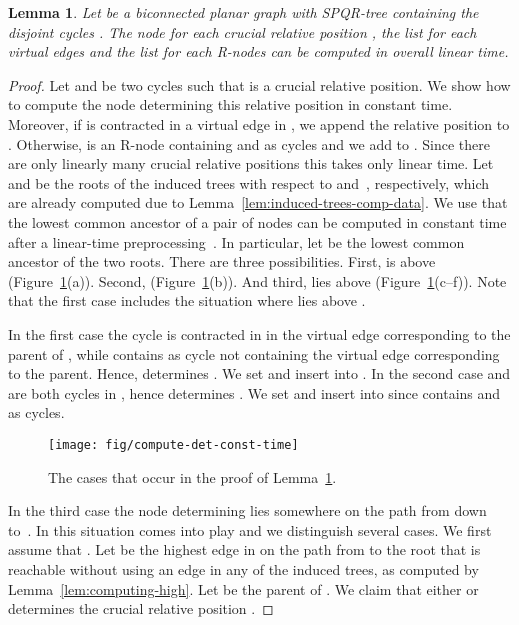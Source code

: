 \documentclass{scrartcl}
\newcommand{\1}[1]{{\normalfont \ensuremath{#1^{\tiny\circled{1}}}}} \newcommand{\2}[1]{{\normalfont \ensuremath{#1^{\tiny\circled{2}}}}} \renewcommand{\k}[1]{{\normalfont \ensuremath{#1^{\tiny\circled{k}}}}} \newcommand{\proj}[2]{\ensuremath{\left.#1\right|_{#2}}} \newcommand{\eps}{\varepsilon}
\theoremstyle{plain} \newtheorem{theorem}{Theorem} \newcounter{lemmacounter} \setcounter{lemmacounter}{0} \newtheorem{lemma}[lemmacounter]{Lemma} \newtheorem{fact}{Fact}  \newtheorem{corollary}{Corollary} \theoremstyle{definition} \newtheorem{definition}{Definition}
\begin{document}
\begin{lemma}
  \label{lem:compute-det-and-contr}
  Let  be a biconnected planar graph with SPQR-tree 
  containing the disjoint cycles .  The node
   for each crucial relative position ,
  the list  for each virtual edges  and the list
   for each R-nodes  can be computed in overall
  linear time.
\end{lemma}
\begin{proof}
  Let  and  be two cycles such that  is a crucial
  relative position.  We show how to compute the node
   determining this relative position in constant
  time.  Moreover, if  is contracted in a virtual edge  in
  , we append the relative position  to
  .  Otherwise,  is an R-node
  containing  and  as cycles and we add  to
  .  Since there are only linearly many
  crucial relative positions this takes only linear time.  Let  and 
  be the roots of the induced trees with respect to  and~,
  respectively, which are already computed due to
  Lemma~\ref{lem:induced-trees-comp-data}.  We use that the lowest
  common ancestor of a pair of nodes can be computed in constant time
  after a linear-time preprocessing~\cite{ht-fafnca-84, bf-lcapr-00}.
  In particular, let  be the lowest common ancestor
  of the two roots.  There are three possibilities.  First,  is above  (Figure~\ref{fig:compute-det-cases}(a)).
  Second, 
  (Figure~\ref{fig:compute-det-cases}(b)).  And third,  lies above 
  (Figure~\ref{fig:compute-det-cases}(c--f)).  Note that the first
  case includes the situation where  lies
  above .

  In the first case the cycle  is contracted in  in the
  virtual edge  corresponding to the parent of , while
   contains  as cycle  not containing the virtual edge
   corresponding to the parent.  Hence,  determines
  .  We set  and insert
   into .  In the second case  and 
  are both cycles in , hence  determines
  .  We set  and insert
   into  since  contains  and
   as cycles.

  \begin{figure}
    \centering
    \texttt{[image: fig/compute-det-const-time]}
    \caption{The cases that occur in the proof of
      Lemma~\ref{lem:compute-det-and-contr}.}
    \label{fig:compute-det-cases}
  \end{figure}

  In the third case the node determining  lies somewhere
  on the path from  down to~.  In this situation
   comes into play and we distinguish several cases.  We
  first assume that .  Let  be the highest edge in  on the path from
   to the root that is reachable without using an edge in any of
  the induced trees, as computed by Lemma~\ref{lem:computing-high}.
  Let  be the parent of .  We claim that either  or
   determines the crucial relative position
  . 


\end{proof}
\end{document}

